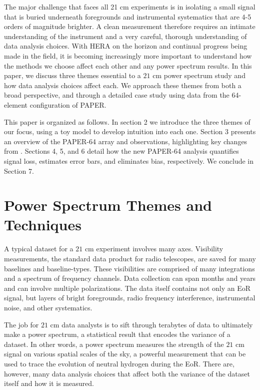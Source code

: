\documentclass[preprint2,numberedappendix,tighten,twocolappendix]{aastex6}  %
\begin{document}
The major challenge that faces all 21 cm experiments is in isolating a small signal that is buried underneath foregrounds and instrumental systematics that are 4-5 orders of magnitude brighter. A clean measurement therefore requires an intimate understanding of the instrument and a very careful, thorough understanding of data analysis choices. With HERA on the horizon and continual progress being made in the field, it is becoming increasingly more important to understand how the methods we choose affect each other and any power spectrum results. In this paper, we discuss three themes essential to a $21$ cm power spectrum study and how data analysis choices affect each. We approach these themes from both a broad perspective, and through a detailed case study using data from the 64-element configuration of PAPER.

This paper is organized as follows. In section 2 we introduce the three themes of our focus, using a toy model to develop intuition into each one. Section 3 presents an overview of the PAPER-64 array and observations, highlighting key changes from \citet{ali_et_al2015}. Sections 4, 5, and 6 detail how the new PAPER-64 analysis quantifies signal loss, estimates error bars, and eliminates bias, respectively. We conclude in Section 7.

\section{Power Spectrum Themes and Techniques}
\label{sec:Themes}

A typical dataset for a $21$ cm experiment involves many axes. Visibility measurements, the standard data product for radio telescopes, are saved for many baselines and baseline-types. These visibilities are comprised of many integrations and a spectrum of frequency channels. Data collection can span months and years and can involve multiple polarizations. The data itself contains not only an EoR signal, but layers of bright foregrounds, radio frequency interference, instrumental noise, and other systematics.

The job for $21$ cm data analysts is to sift through terabytes of data to ultimately make a power spectrum, a statistical result that encodes the variance of a dataset. In other words, a power spectrum measures the strength of the $21$ cm signal on various spatial scales of the sky, a powerful measurement that can be used to trace the evolution of neutral hydrogen during the EoR. There are, however, many data analysis choices that affect both the variance of the dataset itself and how it is measured. 
\end{document}
